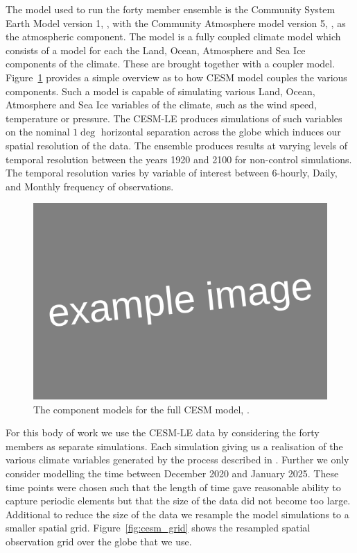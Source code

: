  The model used to run the forty member ensemble is the Community System Earth Model version 1, \citep{hurrell_community_2013}, with the Community Atmosphere model version 5, \citep{hurrell_community_2013}, as the atmospheric component. The model is a fully coupled climate model which consists of a model for each the Land, Ocean, Atmosphere and Sea Ice components of the climate. These are brought together with a coupler model. Figure~\ref{fig:cesm} provides a simple overview as to how CESM model couples the various components. Such a model is capable of simulating various Land, Ocean, Atmosphere and Sea Ice variables of the climate, such as the wind speed, temperature or pressure. The CESM-LE produces simulations of such variables on the nominal $1\deg$ horizontal separation across the globe which induces our spatial resolution of the data.  The ensemble produces results at varying levels of temporal resolution between the years 1920 and 2100 for non-control simulations. The temporal resolution varies by variable of interest between 6-hourly, Daily, and Monthly frequency of observations.
 
 \begin{figure}[htbp!] 
 	\centering    
 	\includegraphics[width=1.0\textwidth]{Example_image}
 	\caption[CESM component models]{The component models for the full CESM model, \citep{kay_community_2015}.}
 	\label{fig:cesm}
 \end{figure}

 
 For this body of work we use the CESM-LE data by considering the forty members as separate simulations. Each simulation giving us a realisation of the various climate variables generated by the process described in \citep{kay_community_2015}. Further we only consider modelling the time between December 2020 and January 2025. These time points were chosen such that the length of time gave reasonable ability to capture periodic elements but that the size of the data did not become too large. Additional to reduce the size of the data we resample the model simulations to a smaller spatial grid. Figure~\ref{fig:cesm_grid} shows the resampled spatial observation grid over the globe that we use.
 
